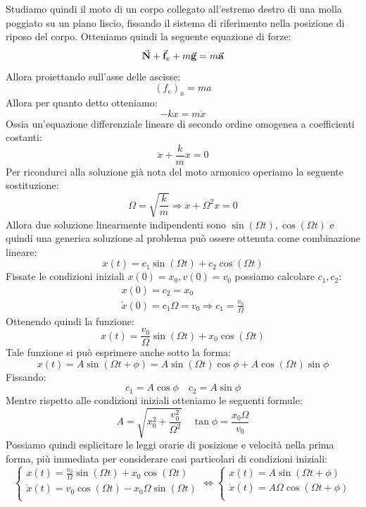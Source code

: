 \documentclass{article}
\newcommand{\then}{\ensuremath{\Rightarrow}}
\renewcommand{\a}{\va{a}}
\newcommand{\N}{\va{N}}
\newcommand{\g}{\va{g}}
\newcommand{\f}{\va{f}}
\begin{document}
Studiamo quindi il moto di un corpo collegato all'estremo destro di una molla poggiato su un piano liscio, fissando il sistema di riferimento nella posizione di riposo del corpo. Otteniamo quindi la seguente equazione di forze:
\[\N+\f_e+m\g=m\a\]
Allora proiettando sull'asse delle ascisse:
\[(f_e)_x=ma\]
Allora per quanto detto otteniamo:
\[-kx=m\ddot{x}\]
Ossia un'equazione differenziale lineare di secondo ordine omogenea a coefficienti costanti:
\[\ddot{x}+\frac{k}{m}x=0\]
Per ricondurci alla soluzione già nota del moto armonico operiamo la seguente sostituzione:
\[\Omega=\sqrt{\frac{k}{m}}\then \ddot{x}+\Omega^2x=0\]
Allora due soluzione linearmente indipendenti sono $\sin(\Omega t),\cos(\Omega t)$ e quindi una generica soluzione al problema può ossere ottenuta come combinazione lineare:
\[x(t)=c_1\sin(\Omega t)+c_2\cos(\Omega t)\]
Fissate le condizioni iniziali $x(0)=x_0,v(0)=v_0$ possiamo calcolare $c_1,c_2$:
\begin{align*}
    x(0)=c_2=x_0\\
    \Dot{x}(0)=c_1\Omega=v_0\then c_1=\frac{v_0}{\Omega}
\end{align*}
Ottenendo quindi la funzione:
\begin{equation}
    \boxed{x(t)=\frac{v_0}{\Omega}\sin(\Omega t)+x_0\cos(\Omega t)}
\end{equation}
Tale funzione si può esprimere anche sotto la forma:
\begin{equation}
    x(t)=A\sin(\Omega t+\phi)=A\sin(\Omega t)\cos\phi+A\cos(\Omega t)\sin\phi
\end{equation}
Fissando:
\[c_1=A\cos\phi\quad c_2=A\sin\phi\]
Mentre rispetto alle condizioni iniziali otteniamo le seguenti formule:
\[A=\sqrt{x_0^2+\frac{v_0^2}{\Omega^2}}\quad \tan\phi=\frac{x_0\Omega}{v_0}\]
Possiamo quindi esplicitare le leggi orarie di posizione e velocità nella prima forma, più immediata per considerare casi particolari di condizioni iniziali:
\[\left\{\begin{array}{l}
    x(t)=\frac{v_0}{\Omega}\sin(\Omega t)+x_0\cos(\Omega t) \\
    \Dot{x}(t)=v_0\cos(\Omega t)-x_0\Omega\sin(\Omega t)  \\
\end{array}\right.\iff
\left\{\begin{array}{l}
    x(t)=A\sin(\Omega t+\phi) \\
    \Dot{x}(t)=A\Omega\cos(\Omega t +\phi)  \\
\end{array}\right.\]
\end{document}
